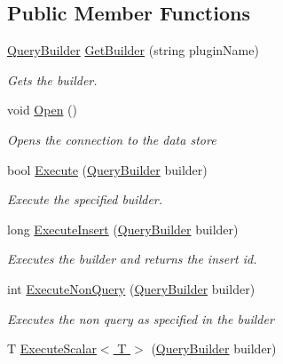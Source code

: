 \subsection*{Public Member Functions}
\begin{DoxyCompactItemize}
\item 
\hyperlink{class_o_t_a_1_1_data_1_1_query_builder}{Query\+Builder} \hyperlink{interface_o_t_a_1_1_data_1_1_i_data_connector_a28ccdcddad275a1e60d0bdb9a5c6fd83}{Get\+Builder} (string plugin\+Name)
\begin{DoxyCompactList}\small\item\em Gets the builder. \end{DoxyCompactList}\item 
void \hyperlink{interface_o_t_a_1_1_data_1_1_i_data_connector_a8dd85cd286ab69385273ab5bda740219}{Open} ()
\begin{DoxyCompactList}\small\item\em Opens the connection to the data store \end{DoxyCompactList}\item 
bool \hyperlink{interface_o_t_a_1_1_data_1_1_i_data_connector_a6f81e38d9f84af55cce71ebe023828ab}{Execute} (\hyperlink{class_o_t_a_1_1_data_1_1_query_builder}{Query\+Builder} builder)
\begin{DoxyCompactList}\small\item\em Execute the specified builder. \end{DoxyCompactList}\item 
long \hyperlink{interface_o_t_a_1_1_data_1_1_i_data_connector_ad3f8800cd5798506a2d64a0fcadc85a2}{Execute\+Insert} (\hyperlink{class_o_t_a_1_1_data_1_1_query_builder}{Query\+Builder} builder)
\begin{DoxyCompactList}\small\item\em Executes the builder and returns the insert id. \end{DoxyCompactList}\item 
int \hyperlink{interface_o_t_a_1_1_data_1_1_i_data_connector_ace7c59afee2994d1596735a14e45eac1}{Execute\+Non\+Query} (\hyperlink{class_o_t_a_1_1_data_1_1_query_builder}{Query\+Builder} builder)
\begin{DoxyCompactList}\small\item\em Executes the non query as specified in the builder \end{DoxyCompactList}\item 
T \hyperlink{interface_o_t_a_1_1_data_1_1_i_data_connector_a37336c1f56b106a2854ad02c8f15972c}{Execute\+Scalar$<$ T $>$} (\hyperlink{class_o_t_a_1_1_data_1_1_query_builder}{Query\+Builder} builder)

\end{DoxyCompactItemize}
